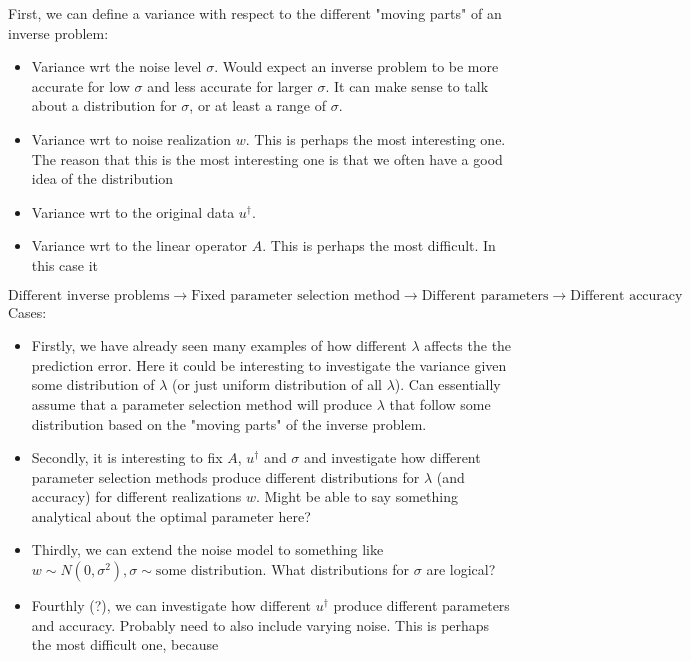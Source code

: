 \documentclass{article}
\begin{document}
First, we can define a variance with respect to the different "moving parts" of an inverse problem:
\begin{itemize}
    \item Variance wrt the noise level $\sigma$. Would expect an inverse problem to be more accurate for low $\sigma$ and less accurate for larger $\sigma$. It can make sense to talk about a distribution for $\sigma$, or at least a range of $\sigma$. 
    \item Variance wrt to noise realization $w$. This is perhaps the most interesting one. The reason that this is the most interesting one is that we often have a good idea of the distribution 
    \item Variance wrt to the original data $u^\dagger$.
    \item Variance wrt to the linear operator $A$. This is perhaps the most difficult. In this case it 
\end{itemize}
\begin{equation}
    \text{Different inverse problems} \rightarrow \text{Fixed parameter selection method} \rightarrow \text{Different parameters} \rightarrow \text{Different accuracy}
\end{equation}
Cases:
\begin{itemize}
    \item Firstly, we have already seen many examples of how different $\lambda$ affects the the prediction error. Here it could be interesting to investigate the variance given some distribution of $\lambda$ (or just uniform distribution of all $\lambda$). Can essentially assume that a parameter selection method will produce $\lambda$ that follow some distribution based on the "moving parts" of the inverse problem.
    \item Secondly, it is interesting to fix $A$, $u^\dagger$ and $\sigma$ and investigate how different parameter selection methods produce different distributions for $\lambda$ (and accuracy) for different realizations $w$. Might be able to say something analytical about the optimal parameter here?
    \item Thirdly, we can extend the noise model to something like $w \sim N(0,\sigma^2), \sigma \sim \text{some distribution}$. What distributions for $\sigma$ are logical?
    \item Fourthly (?), we can investigate how different $u^\dagger$ produce different parameters and accuracy. Probably need to also include varying noise. This is perhaps the most difficult one, because

\end{itemize}
\end{document}
